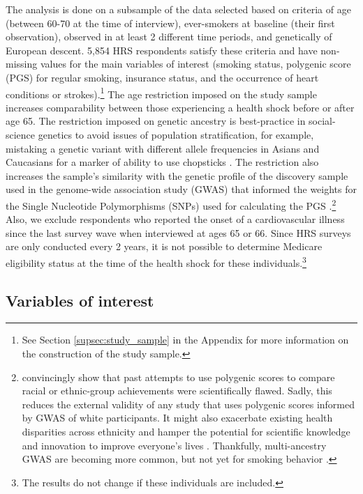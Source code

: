 \documentclass[11pt]{article}
\begin{document}
The analysis is done on a subsample of the data selected based on criteria of age (between 60-70 at the time of interview), ever-smokers at baseline (their first observation), observed in at least 2 different time periods, and genetically of European descent.
5,854 HRS respondents satisfy these criteria and have non-missing values for the main variables of interest (smoking status, polygenic score (PGS) for regular smoking, insurance status, and the occurrence of heart conditions or strokes).\footnote{See Section \ref{supsec:study_sample} in the Appendix for more information on the construction of the study sample.}
The age restriction imposed on the study sample increases comparability between those experiencing a health shock before or after age 65.
The restriction imposed on genetic ancestry is best-practice in social-science genetics to avoid issues of population stratification, for example, mistaking a genetic variant with different allele frequencies in Asians and Caucasians for a marker of ability to use chopsticks \citep{Hamer2000}. The restriction also increases the sample's similarity with the genetic profile of the discovery sample used in the genome-wide association study (GWAS) that informed the weights for the Single Nucleotide Polymorphisms (SNPs) used for calculating the PGS \citep{Martin2017,Freese2018}.\footnote{\cite{Martin2017} convincingly show that past attempts to use polygenic scores to compare racial or ethnic-group achievements were scientifically flawed. Sadly, this reduces the external validity of any study that uses polygenic scores informed by GWAS of white participants. It might also exacerbate existing health disparities across ethnicity and hamper the potential for scientific knowledge and innovation to improve everyone's lives \citep{Martin2019}. Thankfully, multi-ancestry GWAS are becoming more common, but not yet for smoking behavior \citep{Peterson2019}.}
Also, we exclude respondents who reported the onset of a cardiovascular illness since the last survey wave when interviewed at ages 65 or 66. Since HRS surveys are only conducted every 2 years, it is not possible to determine Medicare eligibility status at the time of the health shock for these individuals.\footnote{The results do not change if these individuals are included.}



\subsection{Variables of interest}\label{sec:vars}
\end{document}
